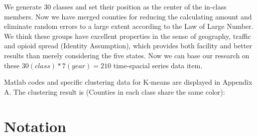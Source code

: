 \documentclass{mcmthesis}
\begin{document}
We generate 30 classes and set their position as the center of the in-class members. Now we have merged counties for reducing the calculating amount and eliminate random errors to a large extent according to the Law of Large Number. We think these groups have excellent properties in the sense of geography, traffic and opioid spread (Identity Assumption), which provides both facility and better results than merely considering the five states. Now we can base our research on these $30(class)*7(year)=210$ time-spacial series data item.

Matlab codes and specific clustering data for K-means are displayed in Appendix A. The clustering result is (Counties in each class share the same color):

\section{Notation}
\end{document}
